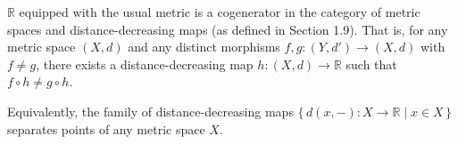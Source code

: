 $\mathbb{R}$ equipped with the usual metric is a cogenerator in the category of metric spaces and distance-decreasing maps (as defined in Section 1.9). That is, for any metric space $(X, d)$ and any distinct morphisms $f, g: (Y, d') \to (X, d)$ with $f \neq g$, there exists a distance-decreasing map $h: (X, d) \to \mathbb{R}$ such that $f \circ h \neq g \circ h$.

Equivalently, the family of distance-decreasing maps $\{\, d(x, -): X \to \mathbb{R} \mid x \in X \,\}$ separates points of any metric space $X$.
